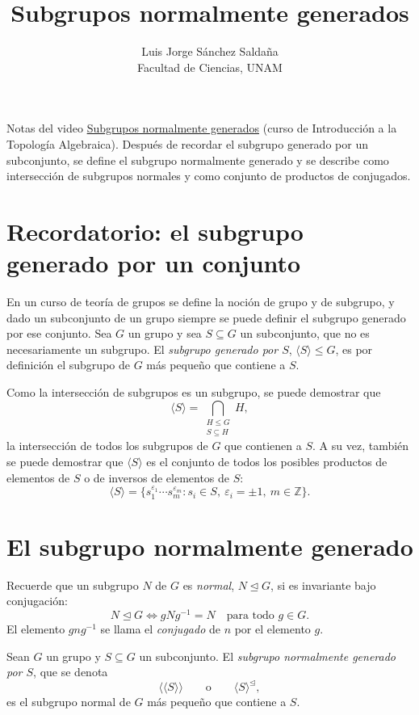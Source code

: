 \documentclass[11pt]{article}
\title{Subgrupos normalmente generados}
\author{Luis Jorge Sánchez Saldaña\\[2pt]\small Facultad de Ciencias, UNAM}
\date{}
\begin{document}
\maketitle

\noindent\small Notas del video
\href{https://www.youtube.com/watch?v=Hcp4r8Opq-M}{\guillemotleft{}Subgrupos normalmente generados\guillemotright{}}
(curso de Introducción a la Topología Algebraica). Después de recordar el subgrupo generado por un subconjunto, se define el subgrupo normalmente generado y se describe como intersección de subgrupos normales y como conjunto de productos de conjugados.
\normalsize

\section*{Recordatorio: el subgrupo generado por un conjunto}

En un curso de teoría de grupos se define la noción de grupo y de subgrupo, y dado un subconjunto de un grupo siempre se puede definir el subgrupo generado por ese conjunto. Sea $G$ un grupo y sea $S\subseteq G$ un subconjunto, que no es necesariamente un subgrupo. El \emph{subgrupo generado por $S$}, $\langle S\rangle\leq G$, es por definición el subgrupo de $G$ más pequeño que contiene a $S$.

Como la intersección de subgrupos es un subgrupo, se puede demostrar que
\[
  \langle S\rangle=\bigcap_{\substack{H\leq G\\ S\subseteq H}}H,
\]
la intersección de todos los subgrupos de $G$ que contienen a $S$. A su vez, también se puede demostrar que $\langle S\rangle$ es el conjunto de todos los posibles productos de elementos de $S$ o de inversos de elementos de $S$:
\[
  \langle S\rangle=\{s_1^{\varepsilon_1}\cdots s_m^{\varepsilon_m} : s_i\in S,\ \varepsilon_i=\pm1,\ m\in\mathbb{Z}\}.
\]

\section*{El subgrupo normalmente generado}

Recuerde que un subgrupo $N$ de $G$ es \emph{normal}, $N\trianglelefteq G$, si es invariante bajo conjugación:
\[
  N\trianglelefteq G\iff gNg^{-1}=N\quad\text{para todo } g\in G.
\]
El elemento $gng^{-1}$ se llama el \emph{conjugado} de $n$ por el elemento $g$.

\begin{defn}\label{defn:normalmente-generado}
Sean $G$ un grupo y $S\subseteq G$ un subconjunto. El \emph{subgrupo normalmente generado por $S$}, que se denota
\[
  \langle\!\langle S\rangle\!\rangle\qquad\text{o}\qquad\langle S\rangle^{\trianglelefteq},
\]
es el subgrupo normal de $G$ más pequeño que contiene a $S$.
\end{defn}
\end{document}
